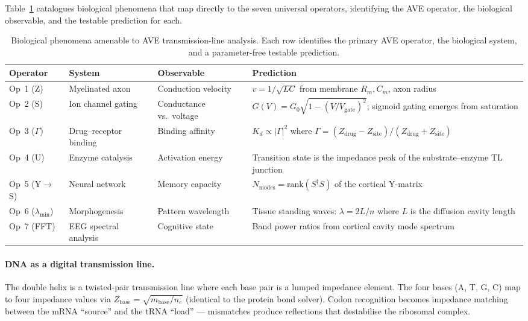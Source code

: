 Table~\ref{tab:research_avenues} catalogues biological
phenomena that map directly to the seven universal operators,
identifying the AVE operator, the biological observable, and
the testable prediction for each.

\begin{table}[H]
\centering
\caption{Biological phenomena amenable to AVE
transmission-line analysis.  Each row identifies the
primary AVE operator, the biological system, and a
parameter-free testable prediction.}
\label{tab:research_avenues}
\small
\setlength{\tabcolsep}{3pt}
\begin{tabular}{@{}p{2.0cm} p{2.5cm} p{3.0cm} p{5.0cm}@{}}
\toprule
\textbf{Operator} & \textbf{System} & \textbf{Observable} & \textbf{Prediction} \\
\midrule
Op~1 (Z) & Myelinated axon & Conduction velocity & $v = 1/\sqrt{LC}$ from membrane $R_m, C_m$, axon radius \\
\addlinespace
Op~2 (S) & Ion channel gating & Conductance vs.\ voltage & $G(V) = G_0 \sqrt{1 - (V/V_\text{gate})^2}$; sigmoid gating emerges from saturation \\
\addlinespace
Op~3 ($\Gamma$) & Drug--receptor binding & Binding affinity & $K_d \propto |\Gamma|^2$ where $\Gamma = (Z_\text{drug} - Z_\text{site})/(Z_\text{drug} + Z_\text{site})$ \\
\addlinespace
Op~4 (U) & Enzyme catalysis & Activation energy & Transition state is the impedance peak of the substrate--enzyme TL junction \\
\addlinespace
Op~5 (Y$\to$S) & Neural network & Memory capacity & $N_\text{modes} = \text{rank}(S^\dagger S)$ of the cortical Y-matrix \\
\addlinespace
Op~6 ($\lambda_\text{min}$) & Morphogenesis & Pattern wavelength & Tissue standing waves: $\lambda = 2L/n$ where $L$ is the diffusion cavity length \\
\addlinespace
Op~7 (FFT) & EEG spectral analysis & Cognitive state & Band power ratios from cortical cavity mode spectrum \\
\bottomrule
\end{tabular}
\end{table}

\paragraph{DNA as a digital transmission line.}
The double helix is a twisted-pair transmission line where
each base pair is a lumped impedance element.  The four bases
(A, T, G, C) map to four impedance values via
$Z_\text{base} = \sqrt{m_\text{base}/n_e}$ (identical to the
protein bond solver).  Codon recognition becomes impedance
matching between the mRNA ``source'' and the tRNA
``load'' --- mismatches produce reflections that destabilise
the ribosomal complex.

